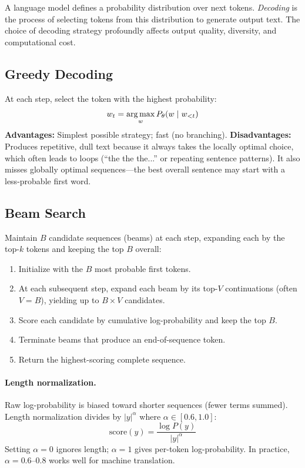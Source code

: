 A language model defines a probability distribution over next tokens.
\emph{Decoding} is the process of selecting tokens from this distribution to
generate output text.  The choice of decoding strategy profoundly affects output
quality, diversity, and computational cost.

\subsection{Greedy Decoding}

At each step, select the token with the highest probability:
\[
    w_t = \operatorname*{arg\,max}_{w} P_\theta(w \mid w_{<t})
\]
\textbf{Advantages:} Simplest possible strategy; fast (no branching).
\textbf{Disadvantages:} Produces repetitive, dull text because it always takes
the locally optimal choice, which often leads to loops (``the the the...'' or
repeating sentence patterns).  It also misses globally optimal sequences---the
best overall sentence may start with a less-probable first word.

\subsection{Beam Search}

Maintain $B$ candidate sequences (beams) at each step, expanding each by the
top-$k$ tokens and keeping the top $B$ overall:

\begin{enumerate}
    \item Initialize with the $B$ most probable first tokens.
    \item At each subsequent step, expand each beam by its top-$V$ continuations
          (often $V = B$), yielding up to $B \times V$ candidates.
    \item Score each candidate by cumulative log-probability and keep the top $B$.
    \item Terminate beams that produce an end-of-sequence token.
    \item Return the highest-scoring complete sequence.
\end{enumerate}

\paragraph{Length normalization.}
Raw log-probability is biased toward shorter sequences (fewer terms summed).
Length normalization divides by $|y|^\alpha$ where $\alpha \in [0.6, 1.0]$:
\[
    \text{score}(y) = \frac{\log P(y)}{|y|^\alpha}
\]
Setting $\alpha = 0$ ignores length; $\alpha = 1$ gives per-token
log-probability.  In practice, $\alpha = 0.6\text{--}0.8$ works well for
machine translation.

